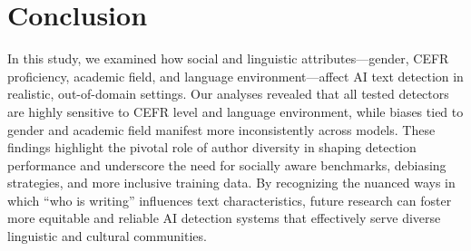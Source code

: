 \section{Conclusion}
\label{sec:conclusion}
In this study, we examined how social and linguistic attributes—gender, CEFR proficiency, academic field, and language environment—affect AI text detection in realistic, out-of-domain settings. Our analyses revealed that all tested detectors are highly sensitive to CEFR level and language environment, while biases tied to gender and academic field manifest more inconsistently across models. These findings highlight the pivotal role of author diversity in shaping detection performance and underscore the need for socially aware benchmarks, debiasing strategies, and more inclusive training data. By recognizing the nuanced ways in which “who is writing” influences text characteristics, future research can foster more equitable and reliable AI detection systems that effectively serve diverse linguistic and cultural communities.
